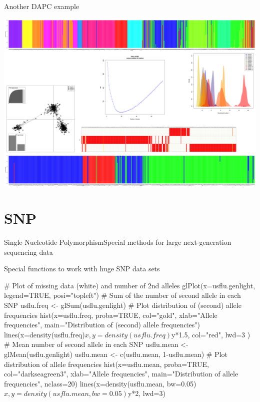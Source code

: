 \documentclass[compress, ucs, xelatex, 11pt, xcolor=svgnames,
  hyperref={
    bookmarks=true,
    unicode=true,
    colorlinks=true,
    pdftitle={Molecular data in R},
    plainpages=false,
    pdfauthor={Vojtech Zeisek},
    pdfsubject={Course about phylogeny and evolution in R},
    pdfcreator={XeLaTeX},
    pdfkeywords={R, evolution, phylogeny, molecular data},
    linkcolor=Tomato,
    anchorcolor=SaddleBrown,
    citecolor=Goldenrod,
    filecolor=DarkMagenta,
    menucolor=Sienna,
    urlcolor=DarkTurquoise,
    pdftex},
  url={hyphens, lowtilde} %
  ]{beamer}
\begin{document}
\begin{frame}{Another DAPC example}
  \begin{center}
    \includegraphics[width=\textwidth-1.5cm]{dapc.png}
  \end{center}
\end{frame}

\section{SNP}

\begin{frame}{Single Nucleotide Polymorphism}{Special methods for large next-generation sequencing data}
  \tableofcontents[currentsection, sectionstyle=show/hide, hideothersubsections]
\end{frame}

\begin{frame}[fragile]{Special functions to work with huge SNP data sets}
  \begin{spluscode}
    # Plot of missing data (white) and number of 2nd alleles
    glPlot(x=usflu.genlight, legend=TRUE, posi="topleft")
    # Sum of the number of second allele in each SNP
    usflu.freq <- glSum(usflu.genlight)
    # Plot distribution of (second) allele frequencies
    hist(x=usflu.freq, proba=TRUE, col="gold", xlab="Allele
      frequencies", main="Distribution of (second) allele frequencies")
    lines(x=density(usflu.freq)$x, y=density(usflu.freq)$y*1.5,
      col="red", lwd=3 )
    # Mean number of second allele in each SNP
    usflu.mean <- glMean(usflu.genlight)
    usflu.mean <- c(usflu.mean, 1-usflu.mean)
    # Plot distribution of allele frequencies
    hist(x=usflu.mean, proba=TRUE, col="darkseagreen3",
      xlab="Allele frequencies", main="Distribution of allele
      frequencies", nclass=20)
    lines(x=density(usflu.mean, bw=0.05)$x, y=density(usflu.mean,
      bw=0.05)$y*2, lwd=3)
  \end{spluscode}
\end{frame}
\end{document}
